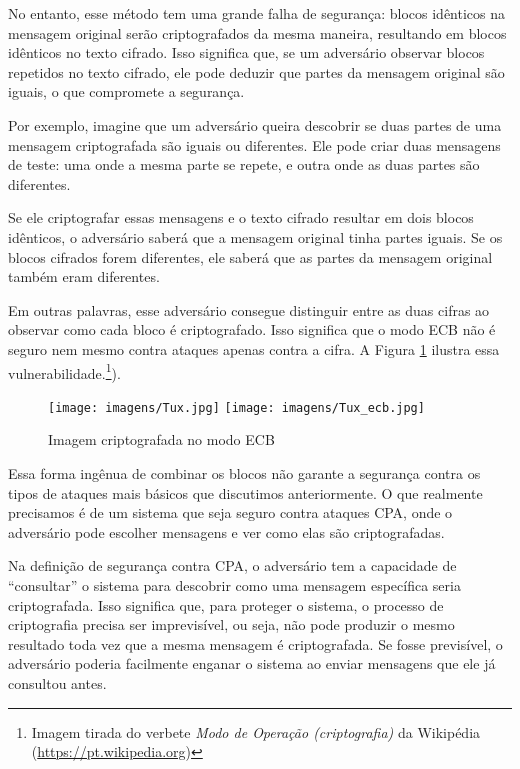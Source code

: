 No entanto, esse método tem uma grande falha de segurança:
blocos idênticos na mensagem original serão criptografados da mesma maneira, resultando em blocos idênticos no texto cifrado.
Isso significa que, se um adversário observar blocos repetidos no texto cifrado, ele pode deduzir que partes da mensagem original são iguais, o que compromete a segurança.

Por exemplo, imagine que um adversário queira descobrir se duas partes de uma mensagem criptografada são iguais ou diferentes.
Ele pode criar duas mensagens de teste:
uma onde a mesma parte se repete, e outra onde as duas partes são diferentes.

Se ele criptografar essas mensagens e o texto cifrado resultar em dois blocos idênticos, o adversário saberá que a mensagem original tinha partes iguais.
Se os blocos cifrados forem diferentes, ele saberá que as partes da mensagem original também eram diferentes.

Em outras palavras, esse adversário consegue distinguir entre as duas cifras ao observar como cada bloco é criptografado.
Isso significa que o modo ECB não é seguro nem mesmo contra ataques apenas contra a cifra.
A Figura \ref{fig:ecb-exemplo} ilustra essa vulnerabilidade.\footnote{Imagem tirada do verbete {\em Modo de Operação (criptografia)} da Wikipédia (\url{https://pt.wikipedia.org})}).

\begin{figure}[!htp]
  \label{fig:ecb-exemplo}
  \centering
  \texttt{[image: imagens/Tux.jpg]}
  \texttt{[image: imagens/Tux\_ecb.jpg]}
  \caption{Imagem criptografada no modo ECB}
\end{figure}

Essa forma ingênua de combinar os blocos não garante a segurança contra os tipos de ataques mais básicos que discutimos anteriormente.
O que realmente precisamos é de um sistema que seja seguro contra ataques CPA, onde o adversário pode escolher mensagens e ver como elas são criptografadas.

Na definição de segurança contra CPA, o adversário tem a capacidade de ``consultar'' o sistema para descobrir como uma mensagem específica seria criptografada.
Isso significa que, para proteger o sistema, o processo de criptografia precisa ser imprevisível, ou seja, não pode produzir o mesmo resultado toda vez que a mesma mensagem é criptografada.
Se fosse previsível, o adversário poderia facilmente enganar o sistema ao enviar mensagens que ele já consultou antes.

